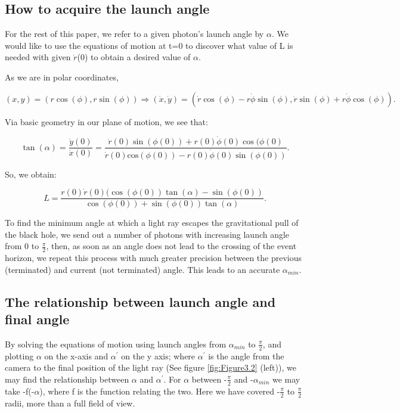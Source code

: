 \documentclass[oneside,openright,frontopenright, singlespacing]{dmathesis}
\begin{document}
\subsection{How to acquire the launch angle}\label{subsec:Subsection3.5.2}

	For the rest of this paper, we refer to a given photon's launch angle by $\alpha$. We would like to use the equations of motion at t=0 to discover what value of L is needed with given $\dot{r}$(0) to obtain a desired value of $\alpha$.

\vspace{1em}
	As we are in polar coordinates, 

	\[(x, y) = (r\cos(\phi), r\sin(\phi)) \Rightarrow (\dot{x}, \dot{y}) = (\dot{r}\cos(\phi) - r\dot{\phi}\sin(\phi), \dot{r}\sin(\phi) + r\dot{\phi}\cos(\phi)).\]
	
\vspace{1em}
	Via basic geometry in our plane of motion, we see that:
			
	\[\tan(\alpha) = \frac{\dot{y}(0)}{\dot{x}(0)} = \frac{\dot{r}(0)\sin(\phi(0)) + r(0)\dot{\phi}(0)\cos(\phi(0)}{\dot{r}(0)\mbox{cos}(\phi(0)) - r(0)\dot{\phi}(0)\sin(\phi(0))}.\]

\vspace{1em}
	So, we obtain:

	\[ L = \frac{r(0)\dot{r}(0)(\cos(\phi(0))\tan(\alpha)-\sin(\phi(0))}{\cos(\phi(0))+\sin(\phi(0))\tan(\alpha)}.\]
	
\vspace{1em}
	To find the minimum angle at which a light ray escapes the gravitational pull of the black hole, we send out a number of photons with increasing launch angle from 0 to $\frac{\pi}{2}$, then, as soon as an angle does not lead to the crossing of the event horizon, we repeat this process with much greater precision between the previous (terminated) and current (not terminated) angle. This leads to an accurate $\alpha_{min}$.

\subsection{The relationship between launch angle and final angle}\label{subsec:Subsection3.5.3}

	By solving the equations of motion using launch angles from $\alpha_{min}$ to $\frac{\pi}{2}$, and plotting $\alpha$ on the x-axis and $\alpha^{'}$ on the y axis; where  $\alpha^{'}$ is the angle from the camera to the final position of the light ray (See figure \ref{fig:Figure3.2} (left)), we may find the relationship between $\alpha$ and $\alpha^{'}$. For $\alpha$ between -$\frac{\pi}{2}$ and -$\alpha_{min}$ we may take -f(-$\alpha$), where f is the function relating the two. Here we have covered -$\frac{\pi}{2}$ to $\frac{\pi}{2}$ radii, more than a full field of view.
\end{document}
